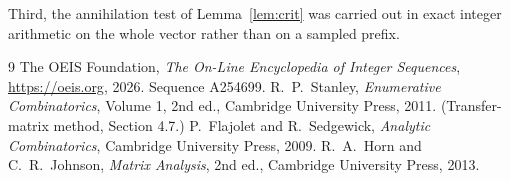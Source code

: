 \documentclass[11pt,a4paper]{article}
\theoremstyle{plain}
\theoremstyle{definition}
\begin{document}
Third, the annihilation test of Lemma~\ref{lem:crit} was carried out in exact integer
arithmetic on the whole vector rather than on a sampled prefix.

\begin{thebibliography}{9}
 The OEIS Foundation, \emph{The On-Line Encyclopedia of Integer
Sequences}, \url{https://oeis.org}, 2026. Sequence A254699.
 R.~P.~Stanley, \emph{Enumerative Combinatorics}, Volume 1, 2nd ed.,
Cambridge University Press, 2011. (Transfer-matrix method, Section 4.7.)
 P.~Flajolet and R.~Sedgewick, \emph{Analytic Combinatorics}, Cambridge
University Press, 2009.
 R.~A.~Horn and C.~R.~Johnson, \emph{Matrix Analysis}, 2nd ed., Cambridge
University Press, 2013.
\end{thebibliography}
\end{document}
